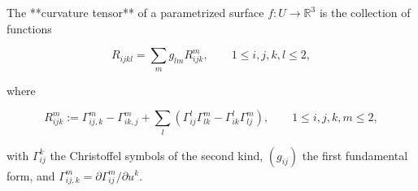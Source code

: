 The **curvature tensor** of a parametrized surface $f: U \to \mathbb{R}^3$ is the collection of functions

$$
R_{ijkl} = \sum_m g_{lm} R_{ijk}^m, \qquad 1 \leq i, j, k, l \leq 2,
$$

where

$$
R_{ijk}^m := \Gamma_{ij,k}^m - \Gamma_{ik,j}^m + \sum_l \left( \Gamma_{ij}^l \Gamma_{lk}^m - \Gamma_{ik}^l \Gamma_{lj}^m \right), \qquad 1 \leq i, j, k, m \leq 2,
$$

with $\Gamma_{ij}^k$ the Christoffel symbols of the second kind, $(g_{ij})$ the first fundamental form, and $\Gamma_{ij,k}^m = \partial \Gamma_{ij}^m / \partial u^k$.
